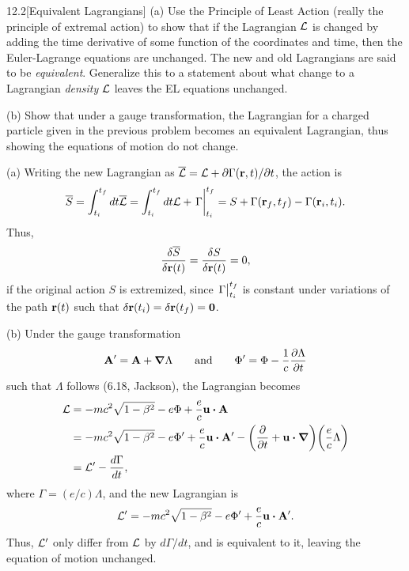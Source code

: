 \documentclass[12pt]{article}
\begin{document}
\begin{problem}{12.2}[Equivalent Lagrangians]
(a) Use the Principle of Least Action (really the principle of extremal action)
to show that if the Lagrangian $\mathcal{L}$ is changed by adding the time derivative of
some function of the coordinates and time, then the Euler-Lagrange equations are
unchanged. The new and old Lagrangians are said to be \textit{equivalent}.
Generalize this to a statement about what change to a Lagrangian
\textit{density} $\mathcal{L}$ leaves the EL equations unchanged.

(b) Show that under a gauge transformation, the Lagrangian for a charged
particle given in the previous problem becomes an equivalent Lagrangian, thus
showing the equations of motion do not change.
\begin{solution}
(a) Writing the new Lagrangian as
$\overline{\mathcal{L}}=\mathcal{L}+\partial\Gamma(\vb{r},t)/\partial t$, the
action is
\begin{equation}
    \overline{S}
    =\int_{t_i}^{t_f}dt\overline\LL
    =\int_{t_i}^{t_f}dt\LL+\eval{\Gamma}_{t_i}^{t_f}
    =S+\Gamma(\vb{r}_f,t_f)-\Gamma(\vb{r}_i,t_i).
\end{equation}
Thus,
\begin{equation}
    \frac{\delta\overline{S}}{\delta\vb{r}(t)} 
    =\frac{\delta S}{\delta\vb{r}(t)}
    =0,
\end{equation}
if the original action $S$ is extremized, since $\eval{\Gamma}_{t_i}^{t_f}$ is 
constant under variations of the path $\vb{r}(t)$ such that $\delta
\vb{r}(t_i)=\delta\vb{r}(t_f)=\vb{0}$.

(b) Under the gauge transformation
\begin{equation}
    \vb{A}'=\vb{A}+\grad\Lambda
    \qquad\text{and}\qquad
    \Phi'=\Phi-\frac1c\frac{\partial\Lambda}{\partial t}
\end{equation}
such that $\Lambda$ follows (6.18, Jackson), the Lagrangian becomes
\begin{align}
    \LL
    &=-mc^2\sqrt{1-\beta^2}-e\Phi+\frac{e}{c}\vb{u}\vdot\vb{A}\notag\\
    &=-mc^2\sqrt{1-\beta^2}-e\Phi'+\frac{e}{c}\vb{u}\vdot\vb{A}'
-\qty(\frac{\partial}{\partial
t}+\vb{u}\vdot\grad)\qty(\frac{e}{c}\Lambda)\notag\\
    &=\LL'-\frac{d\Gamma}{dt},
\end{align}
where $\Gamma=(e/c)\Lambda$, and the new Lagrangian is
\begin{equation}
    \LL'=-mc^2\sqrt{1-\beta^2}-e\Phi'+\frac{e}{c}\vb{u}\vdot\vb{A}'.
\end{equation}
Thus, $\mathcal{L}'$ only differ from $\mathcal{L}$ by $d\Gamma/dt$, and is equivalent to it,
leaving the equation of motion unchanged.
\end{solution}
\end{problem}
\end{document}
